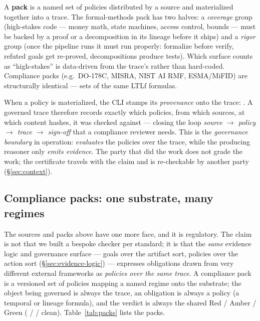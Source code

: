 A \textbf{pack} is a named set of policies distributed by a source and
materialized together into a trace. The formal-methods pack
 has two halves: a \emph{coverage} group (high-stakes
code --- money math, state machines, access control, bounds --- must be backed by
a proof or a decomposition in its lineage before it ships) and a \emph{rigor}
group (once the pipeline runs it must run properly: formalize before verify,
refuted goals get re-proved, decompositions produce tests). Which surface counts
as ``high-stakes'' is data-driven from the trace's 
rather than hard-coded. Compliance packs (e.g.\ DO-178C, MISRA, NIST AI RMF,
ESMA/MiFID) are structurally identical --- sets of the same LTLf formulas.

When a policy is materialized, the CLI stamps its \emph{provenance} onto the
trace: . A governed trace therefore records
exactly which policies, from which sources, at which content hashes, it was
checked against --- closing the loop \emph{source \(\to\) policy \(\to\) trace
\(\to\) sign-off} that a compliance reviewer needs. This is the \emph{governance
boundary} in operation:  \emph{evaluates} the policies over the
trace, while the producing reasoner only \emph{emits evidence}. The party that
did the work does not grade the work; the certificate travels with the claim and
is re-checkable by another party (\S\ref{sec:context}).

\subsection{Compliance packs: one substrate, many regimes}\label{sec:interchange-packs}

The sources and packs above have one more face, and it is regulatory. The claim is not that we built a bespoke checker per standard; it is that
the \emph{same} evidence logic and governance surface --- goals over the artifact sort, policies over the
action sort (\S\ref{sec:evidence-logic}) --- expresses obligations drawn from very different external frameworks
as \emph{policies over the same trace}. A compliance pack is a versioned set of policies mapping a named regime
onto the substrate; the object being governed is always the trace, an obligation is always a policy (a temporal
or lineage formula), and the verdict is always the shared Red / Amber / Green ( /
 / clean). Table~\ref{tab:packs} lists the packs.

